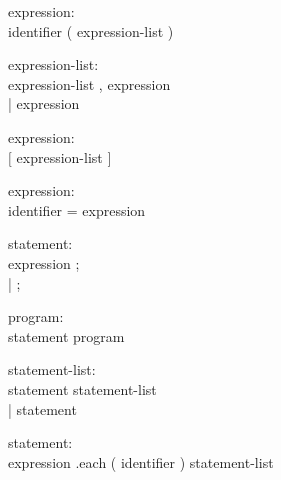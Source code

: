 \documentclass[12pt]{article}
\begin{document}
\begin{description}
  \item[]expression: \hfill \\
    identifier ( expression-list )
\end{description}

\begin{description}
  \item[]expression-list: \hfill \\
    expression-list , expression \\
    | expression
\end{description}

\begin{description}
  \item[]expression: \hfill \\
    $[$ expression-list $]$
\end{description}

\begin{description}
  \item[]expression: \hfill \\
    identifier = expression
\end{description}

\begin{description}
  \item[]statement: \hfill \\
    expression ; \\
    | ;
\end{description}

\begin{description}
  \item[]program: \hfill \\
    statement program
\end{description}

\begin{description}
  \item[]statement-list: \hfill \\
    statement statement-list \\
    | statement
\end{description}

\begin{description}
  \item[]statement: \hfill \\
    expression .each ( identifier ) { statement-list }
\end{description}
\end{document}

